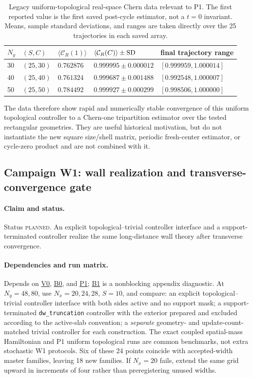 \documentclass[aps,prx,twocolumn,floatfix,nofootinbib,superscriptaddress,longbibliography]{revtex4-2}
\newcommand{\campaignTableSetup}{%
  \footnotesize
  \setlength{\tabcolsep}{4pt}%
  \renewcommand{\arraystretch}{1.12}%
}
\newcommand{\code}[1]{\texttt{#1}}
\newcommand{\planned}{\textsc{planned}}
\newcommand{\campref}[1]{\hyperref[camp:#1]{#1}}
\begin{document}
\begin{table}[t]
\campaignTableSetup
\caption{Legacy uniform-topological real-space Chern data relevant to P1.  The first
reported value is the first saved post-cycle estimator, not a $t=0$ invariant.  Means,
sample standard deviations, and ranges are taken directly over the 25 trajectories in
each saved array.}
\label{tab:P1-legacy}
\begin{tabularx}{\textwidth}{@{}L{0.55}L{0.70}L{1.10}L{1.35}L{1.30}@{}}
\toprule
$N_y$ & $(S,C)$ & $\langle\mathcal C_R(1)\rangle$
& $\langle\mathcal C_R(C)\rangle\pm{\rm SD}$
& final trajectory range \\
 & $(25,30)$ & $0.762876$ & $0.999995\pm0.000012$
& $[0.999959,1.000014]$ \\
40 & $(25,40)$ & $0.761324$ & $0.999687\pm0.001488$
& $[0.992548,1.000007]$ \\
50 & $(25,50)$ & $0.784492$ & $0.999927\pm0.000299$
& $[0.998506,1.000000]$ \\
\bottomrule
\end{tabularx}
\end{table}

The data therefore show rapid and numerically stable convergence of this uniform
topological controller to a Chern-one tripartition estimator over the tested rectangular
geometries.  They are useful historical motivation, but do not instantiate the new square
size/shell matrix, periodic fresh-center estimator, or cycle-zero product and are not
combined with it.

\subsection{Campaign W1: wall realization and transverse-convergence gate}
\label{camp:W1}
\paragraph*{Claim and status.}
Status \planned.  An explicit topological--trivial controller interface and a
support-terminated controller realize the same long-distance wall theory after transverse
convergence.

\paragraph*{Dependencies and run matrix.}
Depends on \campref{V0}, \campref{B0}, and \campref{P1}; \campref{B1} is a nonblocking appendix diagnostic.  At $N_y=48,80$, use
$N_x=20,24,28$, $S=10$, and compare:
an explicit topological--trivial controller interface with both sides active and no support
mask; a support-terminated \code{dw\_truncation} controller with the exterior prepared and
excluded according to the active-slab convention; a \emph{separate} geometry- and
update-count-matched trivial controller for each construction.  The exact coupled
spatial-mass Hamiltonian and P1 uniform topological runs are common benchmarks, not extra
stochastic W1 protocols.  Six of these 24 points coincide with accepted-width master
families, leaving 18 new families.  If $N_x=20$ fails, extend the same grid upward in
increments of four rather than preregistering unused widths.
\end{document}
